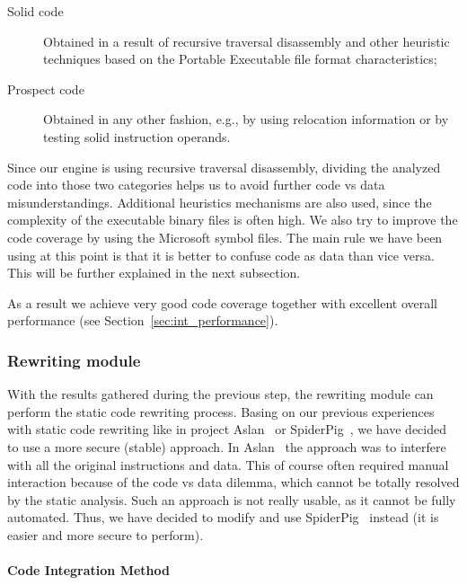 \documentclass[10pt,twocolumn,a4paper]{article}
\begin{document}
\begin{description}
    \item[Solid code] Obtained in a result of recursive traversal disassembly and other heuristic techniques based on the Portable Executable file format characteristics;
    \item[Prospect code] Obtained in any other fashion, e.g., by using relocation information or by testing solid instruction operands.
\end{description}

Since our engine is using recursive traversal disassembly, dividing the analyzed code into those two categories helps us to avoid further code vs data misunderstandings. Additional heuristics mechanisms are also used, since the complexity of the executable binary files is often high. We also try to improve the code coverage by using the Microsoft symbol files. The main rule we have been using at this point is that it is better to confuse code as data than vice versa. This will be further explained in the next subsection.

As a result we achieve very good code coverage together with excellent overall performance (see Section~\ref{sec:int_performance}).

\subsubsection{Rewriting module}\label{int_module}

With the results gathered during the previous step, the rewriting module can perform the static code rewriting process. Basing on our previous experiences with static code rewriting like in project Aslan~\cite{aslan_website} or SpiderPig~\cite{spiderpig_project_website}, we have decided to use a more secure (stable) approach. In Aslan~\cite{aslan_website} the approach was to interfere with all the original instructions and data. This of course often required manual interaction because of the code vs data dilemma, which cannot be totally resolved by the static analysis. Such an approach is not really usable, as it cannot be fully automated. Thus, we have decided to modify and use SpiderPig~\cite{spiderpig_project_website} instead (it is easier and more secure to perform).

\paragraph{Code Integration Method}
\end{document}
